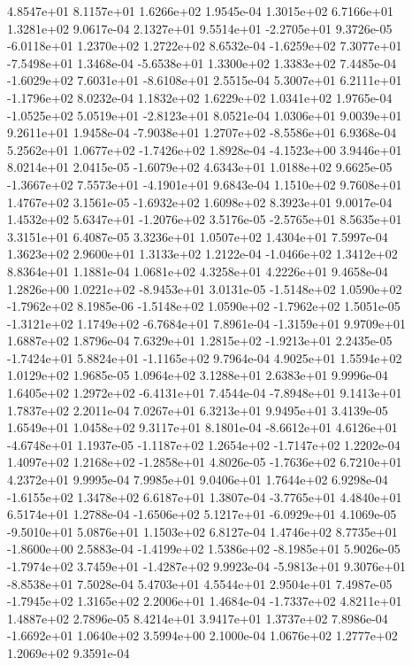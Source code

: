4.8547e+01 8.1157e+01 1.6266e+02  1.9545e-04
1.3015e+02 6.7166e+01 1.3281e+02  9.0617e-04
 2.1327e+01  9.5514e+01 -2.2705e+01  9.3726e-05
-6.0118e+01  1.2370e+02  1.2722e+02  8.6532e-04
-1.6259e+02  7.3077e+01 -7.5498e+01  1.3468e-04
-5.6538e+01  1.3300e+02  1.3383e+02  7.4485e-04
-1.6029e+02  7.6031e+01 -8.6108e+01  2.5515e-04
 5.3007e+01  6.2111e+01 -1.1796e+02  8.0232e-04
1.1832e+02 1.6229e+02 1.0341e+02  1.9765e-04
-1.0525e+02  5.0519e+01 -2.8123e+01  8.0521e-04
1.0306e+01 9.0039e+01 9.2611e+01  1.9458e-04
-7.9038e+01  1.2707e+02 -8.5586e+01  6.9368e-04
 5.2562e+01  1.0677e+02 -1.7426e+02  1.8928e-04
-4.1523e+00  3.9446e+01  8.0214e+01  2.0415e-05
-1.6079e+02  4.6343e+01  1.0188e+02  9.6625e-05
-1.3667e+02  7.5573e+01 -4.1901e+01  9.6843e-04
1.1510e+02 9.7608e+01 1.4767e+02  3.1561e-05
-1.6932e+02  1.6098e+02  8.3923e+01  9.0017e-04
 1.4532e+02  5.6347e+01 -1.2076e+02  3.5176e-05
-2.5765e+01  8.5635e+01  3.3151e+01  6.4087e-05
3.3236e+01 1.0507e+02 1.4304e+01  7.5997e-04
1.3623e+02 2.9600e+01 1.3133e+02  1.2122e-04
-1.0466e+02  1.3412e+02  8.8364e+01  1.1881e-04
1.0681e+02 4.3258e+01 4.2226e+01  9.4658e-04
 1.2826e+00  1.0221e+02 -8.9453e+01  3.0131e-05
-1.5148e+02  1.0590e+02 -1.7962e+02  8.1985e-06
-1.5148e+02  1.0590e+02 -1.7962e+02  1.5051e-05
-1.3121e+02  1.1749e+02 -6.7684e+01  7.8961e-04
-1.3159e+01  9.9709e+01  1.6887e+02  1.8796e-04
 7.6329e+01  1.2815e+02 -1.9213e+01  2.2435e-05
-1.7424e+01  5.8824e+01 -1.1165e+02  9.7964e-04
4.9025e+01 1.5594e+02 1.0129e+02  1.9685e-05
1.0964e+02 3.1288e+01 2.6383e+01  9.9996e-04
 1.6405e+02  1.2972e+02 -6.4131e+01  7.4544e-04
-7.8948e+01  9.1413e+01  1.7837e+02  2.2011e-04
7.0267e+01 6.3213e+01 9.9495e+01  3.4139e-05
1.6549e+01 1.0458e+02 9.3117e+01  8.1801e-04
-8.6612e+01  4.6126e+01 -4.6748e+01  1.1937e-05
-1.1187e+02  1.2654e+02 -1.7147e+02  1.2202e-04
 1.4097e+02  1.2168e+02 -1.2858e+01  4.8026e-05
-1.7636e+02  6.7210e+01  4.2372e+01  9.9995e-04
7.9985e+01 9.0406e+01 1.7644e+02  6.9298e-04
-1.6155e+02  1.3478e+02  6.6187e+01  1.3807e-04
-3.7765e+01  4.4840e+01  6.5174e+01  1.2788e-04
-1.6506e+02  5.1217e+01 -6.0929e+01  4.1069e-05
-9.5010e+01  5.0876e+01  1.1503e+02  6.8127e-04
 1.4746e+02  8.7735e+01 -1.8600e+00  2.5883e-04
-1.4199e+02  1.5386e+02 -8.1985e+01  5.9026e-05
-1.7974e+02  3.7459e+01 -1.4287e+02  9.9923e-04
-5.9813e+01  9.3076e+01 -8.8538e+01  7.5028e-04
5.4703e+01 4.5544e+01 2.9504e+01  7.4987e-05
-1.7945e+02  1.3165e+02  2.2006e+01  1.4684e-04
-1.7337e+02  4.8211e+01  1.4887e+02  2.7896e-05
8.4214e+01 3.9417e+01 1.3737e+02  7.8986e-04
-1.6692e+01  1.0640e+02  3.5994e+00  2.1000e-04
1.0676e+02 1.2777e+02 1.2069e+02  9.3591e-04
